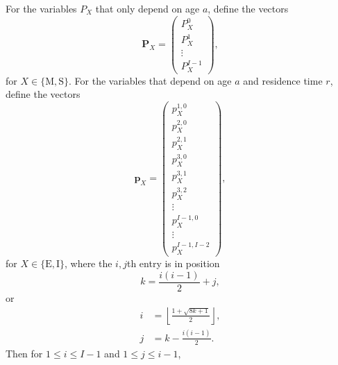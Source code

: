 \documentclass[12pt]{article}
\renewcommand{\vec}[1]{\mathbf{#1}}
\begin{document}
For the variables $P_X$ that only depend on age $a$,
define the vectors
\begin{equation}
  \vec{P}_X =
  \begin{pmatrix}
    P_X^0\\
    P_X^1\\
    \vdots\\
    P_X^{I - 1}
  \end{pmatrix},
\end{equation}
for $X \in \{\mathrm{M}, \mathrm{S}\}$.
For the variables that depend on age $a$ and residence time $r$,
define the vectors
\begin{equation}
  \vec{p}_X =
  \begin{pmatrix}
    p_X^{1, 0}\\
    p_X^{2, 0}\\
    p_X^{2, 1}\\
    p_X^{3, 0}\\
    p_X^{3, 1}\\
    p_X^{3, 2}\\
    \vdots\\
    p_X^{I - 1, 0}\\
    \vdots\\
    p_X^{I - 1, I - 2}
  \end{pmatrix},
\end{equation}
for $X \in \{\mathrm{E}, \mathrm{I}\}$,
where the $i, j$th entry is in position
\begin{equation}
  k = \frac{i (i - 1)}{2} + j,
\end{equation}
or
\begin{align}
  i &= \left\lfloor\frac{1 + \sqrt{8 k + 1}}{2}\right\rfloor,
  \\
  j &= k - \frac{i (i - 1)}{2}.
\end{align}
Then for $1 \leq i \leq I - 1$ and $1 \leq j \leq i - 1$,
\end{document}
